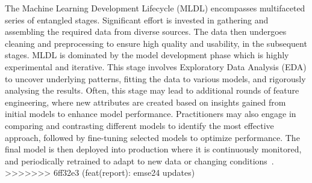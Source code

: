 The Machine Learning Development Lifecycle (MLDL) encompasses multifaceted series of entangled stages. Significant effort is invested in gathering and assembling the required data from diverse sources. The data then undergoes cleaning and preprocessing to ensure high quality and usability, in the subsequent stages. MLDL is dominated by the model development phase which is highly experimental and iterative. This stage involves Exploratory Data Analysis (EDA) to uncover underlying patterns, fitting the data to various models, and rigorously analysing the results. Often, this stage may lead to additional rounds of feature engineering, where new attributes are created based on insights gained from initial models to enhance model performance. Practitioners may also engage in comparing and contrasting different models to identify the most effective approach, followed by fine-tuning selected models to optimize performance. The final model is then deployed into production where it is continuously monitored, and periodically retrained to adapt to new data or changing conditions~\cite{haakman2021ai,amershi2019software,sculley2015hidden}.
>>>>>>> 6ff32e3 (feat(report): emse24 updates)


